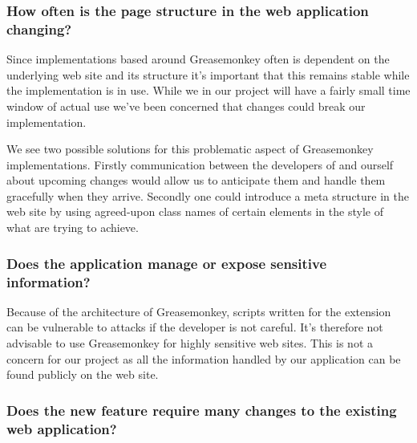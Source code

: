 \subsubsection{How often is the page structure in the web application
  changing?}

Since implementations based around Greasemonkey often is dependent on the
underlying web site and its structure it's important that this remains
stable while the implementation is in use. While we in our project
will have a fairly small time window of actual use we've been concerned
that changes could break our implementation.

We see two possible solutions for this problematic aspect of Greasemonkey
implementations. Firstly communication between the developers of
\urort{} and ourself about upcoming changes would allow us to anticipate
them and handle them gracefully when they arrive. Secondly one could
introduce a meta structure in the web site by using agreed-upon
class names of certain  elements in the style of
what %
are trying to achieve.

\subsubsection{Does the application manage or expose sensitive information?}

Because of the architecture of Greasemonkey, scripts written for the extension
can be vulnerable to attacks if the developer is not careful. It's
therefore not advisable to use Greasemonkey for highly sensitive web sites.
This is not a concern for our project as all the information handled by our
application can be found publicly on the \urort{}
web site.

\subsubsection{Does the new feature require many changes to the existing web
  application?}

